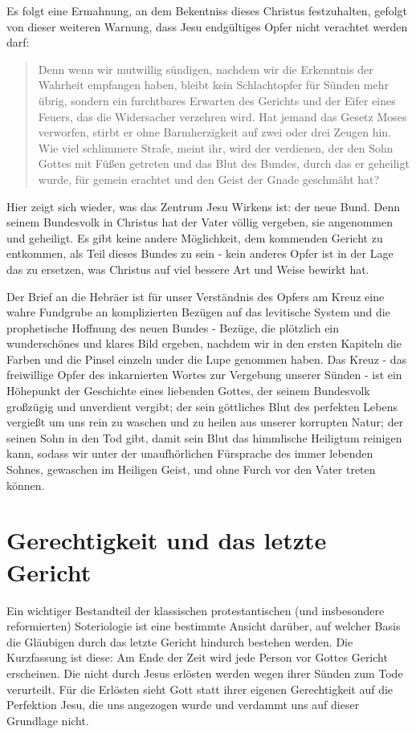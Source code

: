 Es folgt eine Ermahnung, an dem Bekentniss dieses Christus festzuhalten, gefolgt von dieser weiteren Warnung, dass Jesu endgültiges Opfer nicht verachtet werden darf:
\begin{quote}
Denn wenn wir mutwillig sündigen, nachdem wir die Erkenntnis der Wahrheit empfangen haben, bleibt kein Schlachtopfer für Sünden mehr übrig,
sondern ein furchtbares Erwarten des Gerichts und der Eifer eines Feuers, das die Widersacher verzehren wird.
Hat jemand das Gesetz Moses verworfen, stirbt er ohne Barmherzigkeit auf zwei oder drei Zeugen hin.
Wie viel schlimmere Strafe, meint ihr, wird der verdienen, der den Sohn Gottes mit Füßen getreten und das Blut des Bundes,
durch das er geheiligt wurde, für gemein erachtet und den Geist der Gnade geschmäht hat?
\end{quote}
Hier zeigt sich wieder, was das Zentrum Jesu Wirkens ist: der neue Bund.
Denn seinem Bundesvolk in Christus hat der Vater völlig vergeben, sie angenommen und geheiligt.
Es gibt keine andere Möglichkeit, dem kommenden Gericht zu entkommen, als Teil dieses Bundes zu sein -
kein anderes Opfer ist in der Lage das zu ersetzen, was Christus auf viel bessere Art und Weise bewirkt hat.


Der Brief an die Hebräer ist für unser Verständnis des Opfers am Kreuz eine wahre Fundgrube an komplizierten Bezügen auf das levitische System und die prophetische Hoffnung
des neuen Bundes -
Bezüge, die plötzlich ein wunderschönes und klares Bild ergeben,
nachdem wir in den ersten Kapiteln die Farben und die Pinsel einzeln under die Lupe genommen haben.
Das Kreuz - das freiwillige Opfer des inkarnierten Wortes zur Vergebung unserer Sünden - ist ein Höhepunkt der Geschichte eines liebenden Gottes,
der seinem Bundesvolk großzügig und unverdient vergibt; der sein göttliches Blut des perfekten Lebens vergießt um uns rein zu waschen und zu heilen aus unserer korrupten Natur;
der seinen Sohn in den Tod gibt, damit sein Blut das himmlische Heiligtum reinigen kann, sodass wir unter der unaufhörlichen Fürsprache des immer lebenden Sohnes,
gewaschen im Heiligen Geist, und ohne Furch vor den Vater treten können.

\chapter{Gerechtigkeit und das letzte Gericht}
Ein wichtiger Bestandteil der klassischen protestantischen (und insbesondere reformierten) Soteriologie ist eine bestimmte
Ansicht darüber, auf welcher Basis die Gläubigen durch das letzte Gericht hindurch bestehen werden.
Die Kurzfassung ist diese:
Am Ende der Zeit wird jede Person vor Gottes Gericht erscheinen. Die nicht durch Jesus erlösten werden wegen ihrer Sünden zum Tode verurteilt.
Für die Erlösten sieht Gott statt ihrer eigenen Gerechtigkeit auf die Perfektion Jesu, die uns angezogen wurde und verdammt uns auf dieser Grundlage nicht.


